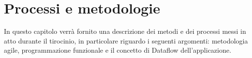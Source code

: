 
\chapter{Processi e metodologie}
\label{cap:processi-metodologie}

In questo capitolo verrà fornito una descrizione dei metodi e dei processi messi in atto durante il tirocinio, in particolare riguardo i seguenti argomenti: metodologia agile, programmazione funzionale e il concetto di Dataflow dell'applicazione.

